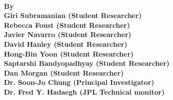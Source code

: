 \vspace*{3cm}
\begin{center}
{\bf 
{\fontsize{50cm}{25pt}} \\
\vspace{0.5cm}
{\large By}\\
\vspace{0.5cm}
{\Large Giri Subramanian (Student Researcher)\\
Rebecca Foust (Student Researcher)\\
Javier Navarro (Student Researcher)\\
David Hanley (Student Researcher)\\
Hong-Bin Yoon (Student Researcher)\\
Saptarshi Bandyopadhyay (Student Researcher)\\
Dan Morgan (Student Researcher)\\
Dr. Soon-Jo Chung (Principal Investigator)\\
Dr. Fred Y. Hadaegh (JPL Technical monitor)
}
}
\end{center}
\vspace{1cm}
